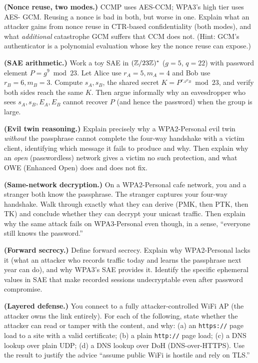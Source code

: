 \begin{exercise}
\textbf{(Nonce reuse, two modes.)} CCMP uses AES-CCM; WPA3's high tier uses AES-
GCM. Reusing a nonce is bad in both, but worse in one. Explain what an attacker
gains from nonce reuse in CTR-based confidentiality (both modes), and what
\emph{additional} catastrophe GCM suffers that CCM does not. (Hint: GCM's
authenticator is a polynomial evaluation whose key the nonce reuse can expose.)
\end{exercise}

\begin{exercise}
\textbf{(SAE arithmetic.)} Work a toy SAE in $(\mathbb{Z}/23\mathbb{Z})^{*}$ ($g = 5$, $q = 22$) with
password element $P = g^{9} \bmod 23$. Let Alice use $r_A = 5, m_A = 4$ and Bob
use $r_B = 6, m_B = 3$. Compute $s_A, s_B$, the shared secret $K = P^{r_A r_B}
\bmod 23$, and verify both sides reach the same $K$. Then argue informally why an
eavesdropper who sees $s_A, s_B, E_A, E_B$ cannot recover $P$ (and hence the
password) when the group is large.
\end{exercise}

\begin{exercise}
\textbf{(Evil twin reasoning.)} Explain precisely why a WPA2-Personal evil twin
\emph{without} the passphrase cannot complete the four-way handshake with a victim
client, identifying which message it fails to produce and why. Then explain why an
\emph{open} (passwordless) network gives a victim no such protection, and what OWE
(Enhanced Open) does and does not fix.
\end{exercise}

\begin{exercise}
\textbf{(Same-network decryption.)} On a WPA2-Personal cafe network, you and a
stranger both know the passphrase. The stranger captures your four-way handshake.
Walk through exactly what they can derive (PMK, then PTK, then TK) and conclude
whether they can decrypt your unicast traffic. Then explain why the same attack
fails on WPA3-Personal even though, in a sense, ``everyone still knows the
password.''
\end{exercise}

\begin{exercise}
\textbf{(Forward secrecy.)} Define forward secrecy. Explain why WPA2-Personal lacks
it (what an attacker who records traffic today and learns the passphrase next year
can do), and why WPA3's SAE provides it. Identify the specific ephemeral values in
SAE that make recorded sessions undecryptable even after password compromise.
\end{exercise}

\begin{exercise}
\textbf{(Layered defense.)} You connect to a fully attacker-controlled WiFi AP
(the attacker owns the link entirely). For each of the following, state whether the
attacker can read or tamper with the content, and why: (a) an \texttt{https://}
page load to a site with a valid certificate; (b) a plain \texttt{http://} page
load; (c) a DNS lookup over plain UDP; (d) a DNS lookup over DoH (DNS-over-HTTPS).
Use the result to justify the advice ``assume public WiFi is hostile and rely on
TLS.''
\end{exercise}
